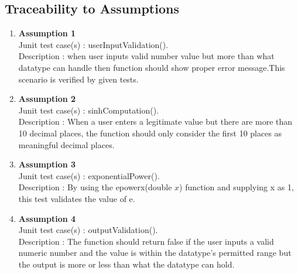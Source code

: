 \documentclass[
	12pt
]{article}
\begin{document}
\subsection{Traceability to Assumptions}
\begin{enumerate}
    \item \textbf{Assumption 1}\\
    Junit test case(s) : userInputValidation(). \\
    Description : when user inputs valid number value but more than what datatype can handle then function should show  proper error message.This scenario is verified by given tests.
    \item \textbf{Assumption 2}\\
    Junit test case(s) : sinhComputation(). \\
    Description : When a user enters a legitimate value but there are more than 10 decimal places, the function should only consider the first 10 places as meaningful decimal places.
    \item
    \textbf{Assumption 3} \\
    Junit test case(s) : exponentialPower(). \\
    Description : By using the epowerx(double $x$) function and supplying x as 1, this test validates the value of e.
    \item
   \textbf{Assumption 4} \\
    Junit test case(s) : outputValidation(). \\
    Description : The function should return false if the user inputs a valid numeric number and the value is within the datatype's permitted range but the output is more or less than what the datatype can hold.
\end{enumerate}

\printindex
\nocite{*}


\end{document}
